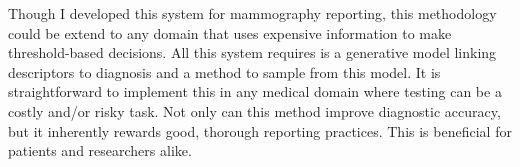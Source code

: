 Though I developed this system for mammography reporting, this methodology could be extend to any domain that uses expensive information to make threshold-based decisions. All this system requires is a generative model linking descriptors to diagnosis and a method to sample from this model. It is straightforward to implement this in any medical domain where testing can be a costly and/or risky task. Not only can this method improve diagnostic accuracy, but it inherently rewards good, thorough reporting practices. This is beneficial for patients and researchers alike.

